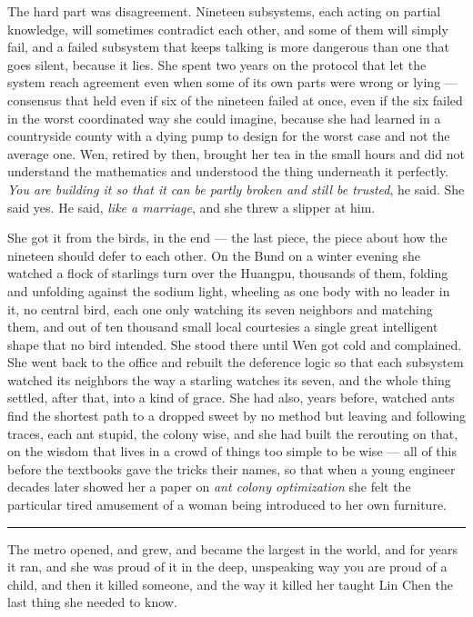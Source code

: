 The hard part was disagreement. Nineteen subsystems, each acting on partial knowledge, will sometimes contradict each other, and some of them will simply fail, and a failed subsystem that keeps talking is more dangerous than one that goes silent, because it lies. She spent two years on the protocol that let the system reach agreement even when some of its own parts were wrong or lying --- consensus that held even if six of the nineteen failed at once, even if the six failed in the worst coordinated way she could imagine, because she had learned in a countryside county with a dying pump to design for the worst case and not the average one. Wen, retired by then, brought her tea in the small hours and did not understand the mathematics and understood the thing underneath it perfectly. \emph{You are building it so that it can be partly broken and still be trusted}, he said. She said yes. He said, \emph{like a marriage}, and she threw a slipper at him.

She got it from the birds, in the end --- the last piece, the piece about how the nineteen should defer to each other. On the Bund on a winter evening she watched a flock of starlings turn over the Huangpu, thousands of them, folding and unfolding against the sodium light, wheeling as one body with no leader in it, no central bird, each one only watching its seven neighbors and matching them, and out of ten thousand small local courtesies a single great intelligent shape that no bird intended. She stood there until Wen got cold and complained. She went back to the office and rebuilt the deference logic so that each subsystem watched its neighbors the way a starling watches its seven, and the whole thing settled, after that, into a kind of grace. She had also, years before, watched ants find the shortest path to a dropped sweet by no method but leaving and following traces, each ant stupid, the colony wise, and she had built the rerouting on that, on the wisdom that lives in a crowd of things too simple to be wise --- all of this before the textbooks gave the tricks their names, so that when a young engineer decades later showed her a paper on \emph{ant colony optimization} she felt the particular tired amusement of a woman being introduced to her own furniture.

\begin{center}\rule{0.3\linewidth}{0.4pt}\end{center}

The metro opened, and grew, and became the largest in the world, and for years it ran, and she was proud of it in the deep, unspeaking way you are proud of a child, and then it killed someone, and the way it killed her taught Lin Chen the last thing she needed to know.

